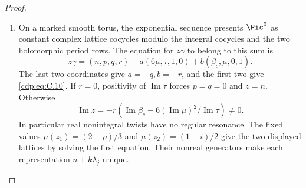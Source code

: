 \begin{proof}

\begin{enumerate}[label={$\langle1\rangle$\arabic*.},leftmargin=*]
\item On a marked smooth torus, the exponential sequence presents $\Pic^0$ as constant complex lattice cocycles modulo the integral cocycles and the two holomorphic period rows. The equation for $z\gamma$ to belong to this sum is
\[
 z\gamma=(n,p,q,r)+a(6\mu,\tau,1,0)+b(\beta_c,\mu,0,1).
\]
The last two coordinates give $a=-q,b=-r$, and the first two give \eqref{cdp:eq:C.10}. If $r=0$, positivity of $\operatorname{Im}\tau$ forces $p=q=0$ and $z=n$. Otherwise
\[
 \operatorname{Im}z=-r\left(\operatorname{Im}\beta_c-
           6(\operatorname{Im}\mu)^2/\operatorname{Im}\tau\right)\ne0.
\]
In particular real nonintegral twists have no regular resonance. The fixed values $\mu(z_1)=(2-\rho)/3$ and $\mu(z_2)=(1-i)/2$ give the two displayed lattices by solving the first equation. Their nonreal generators make each representation $n+k\lambda_j$ unique.


\end{enumerate}
\end{proof}

